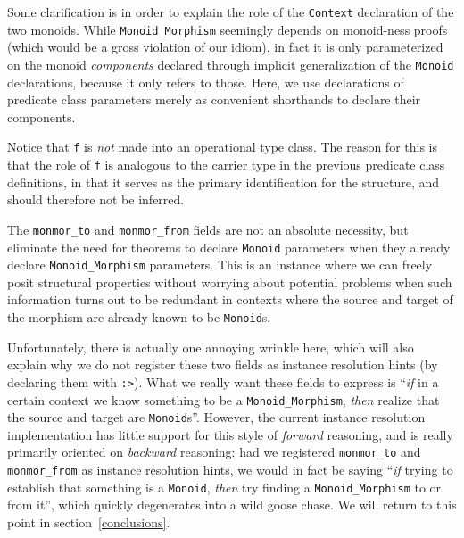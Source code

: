 \documentclass[a4paper,10pt,runningheads]{llncs}
\begin{document}
Some clarification is in order to explain the role of the \lstinline|Context| declaration of the two monoids. While \lstinline|Monoid_Morphism| seemingly depends on monoid-ness proofs (which would be a gross violation of our idiom), in fact it is only parameterized on the monoid \emph{components} declared through implicit generalization of the \lstinline|Monoid| declarations, because it only refers to those. Here, we use declarations of predicate class parameters merely as convenient shorthands to declare their components.

Notice that \lstinline|f| is \emph{not} made into an operational type class. The reason for this is that the role of \lstinline|f| is analogous to the carrier type in the previous predicate class definitions, in that it serves as the primary identification for the structure, and should therefore not be inferred.

The \lstinline|monmor_to| and \lstinline|monmor_from| fields are not an absolute necessity, but eliminate the need for theorems to declare \lstinline|Monoid| parameters when they already declare \lstinline|Monoid_Morphism| parameters. This is an instance where we can freely posit structural properties without worrying about potential problems when such information turns out to be redundant in contexts where the source and target of the morphism are already known to be \lstinline|Monoid|s.

Unfortunately, there is actually one annoying wrinkle here, which will also explain why we do not register these two fields as instance resolution hints (by declaring them with \lstinline|:>|). What we really want these fields to express is ``\emph{if} in a certain context we know something to be a \lstinline|Monoid_Morphism|, \emph{then} realize that the source and target are \lstinline|Monoid|s''. However, the current instance resolution implementation has little support for this style of \emph{forward} reasoning, and is really primarily oriented on \emph{backward} reasoning: had we registered \lstinline|monmor_to| and \lstinline|monmor_from| as instance resolution hints, we would in fact be saying ``\emph{if} trying to establish that something is a \lstinline|Monoid|, \emph{then} try finding a \lstinline|Monoid_Morphism| to or from it'', which quickly degenerates into a wild goose chase. We will return to this point in section~\ref{conclusions}.


% 
\end{document}
